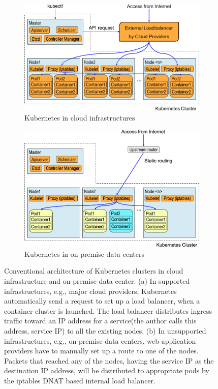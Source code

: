 \begin{figure}[tb]

  \begin{subfigure}[t]{\columnwidth}
    \centering
    \includegraphics[width=0.8\columnwidth]{Figs/K8sConventional}
    \caption{Kubernetes in cloud infrastructures}
    \label{fig:K8sConventional}
  \end{subfigure}

  \par\bigskip
  \par\bigskip

  \begin{subfigure}[t]{\columnwidth}
    \centering
    \includegraphics[width=0.8\columnwidth]{Figs/K8sConventional_bm}
    \caption{Kubernetes in on-premise data centers}
    \label{fig:K8sConventional_bm}
  \end{subfigure}

  \centering

  \begin{minipage}{1.0\columnwidth}
    \caption[Conventional architecture of Kubernetes clusters]
            {Conventional architecture of Kubernetes clusters in cloud infrastructure and on-premise data center.
(a) In supported infrastructures, e.g., major cloud providers, Kubernetes automatically send a request to set up a load balancer, when a container cluster is launched.
 The load balancer distributes ingress traffic toward an IP address for a service(the author calls this address, service IP) to all the existing nodes.
(b) In unsupported infrastructures, e.g., on-premise data centers, web application providers have to manually set up a route to one of the nodes.
Packets that reached any of the nodes, having the service IP as the destination IP address, will be distributed to appropriate pods by the iptables DNAT based internal load balancer.
            }
  \end{minipage}


\end{figure}
